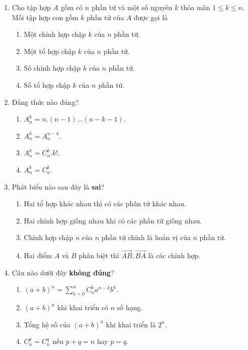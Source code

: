 \begin{enumerate}[label=\textbf{Câu \arabic*.},align=left,left=0cm..0cm,itemindent=*]
\begin{multicols}{4}
\begin{enumerate}[label=\textbf{\Alph*.},align=left,left=1cm..0cm,itemindent=*]
	\end{enumerate}\end{multicols}
	\item Cho tập hợp $A$ gồm có $n$ phần tử và một số nguyên $k$ thỏa mãn $1\leqslant k\leqslant n$. Mỗi tập hợp con gồm $k$ phần tử của $A$ được gọi là
	\begin{enumerate}[label=\textbf{\Alph*.},align=left,left=1cm..0cm,itemindent=*]
		\item Một chỉnh hợp chập $k$ của $n$ phần tử.
		\item Một tổ hợp chập $k$ của $n$ phần tử.
		\item Số chỉnh hợp chập $k$ của $n$ phần tử.
		\item Số tổ hợp chập $k$ của $n$ phần tử.
	\end{enumerate}
	\item Đẳng thức nào đúng?
	\begin{enumerate}[label=\textbf{\Alph*.},align=left,left=1cm..0cm,itemindent=*]
		\item $A_n^k=n.\left( n-1 \right)...\left( n-k-1 \right)$.
		\item $A_n^k=A_{n}^{n-k}$.
		\item $A_n^k=C_{n}^{k}.k!$.
		\item $A_n^k=C_{n}^{k}$.
	\end{enumerate}
	\item Phát biểu nào sau đây là \textbf{sai}?
	\begin{enumerate}[label=\textbf{\Alph*.},align=left,left=1cm..0cm,itemindent=*]
		\item Hai tổ hợp khác nhau thì có các phân tử khác nhau.
		\item Hai chỉnh hợp giống nhau khi có các phần tử giống nhau.
		\item Chỉnh hợp chập $n$ của $n$ phần tử chính là hoán vị của $n$ phần tử.
		\item Hai điểm $A$ và $B$ phân biệt thì $\overrightarrow{AB},\overrightarrow{BA}$ là các chỉnh hợp.
	\end{enumerate}
	\item Câu nào dưới đây \textbf{không đúng}?
	\begin{enumerate}[label=\textbf{\Alph*.},align=left,left=1cm..0cm,itemindent=*]
		\item $(a+b)^n=\sum_{k=0}^nC_n^ka^{n-k}b^k$.
		\item $(a+b)^n$ khi khai triển có $n$ số hạng.
		\item Tổng hệ số của $(a+b)^n$ khi khai triển là $2^n$.
		\item $C_n^p=C_n^q$ nếu $p+q=n$ hay $p=q$.

\end{enumerate}
\end{enumerate}
